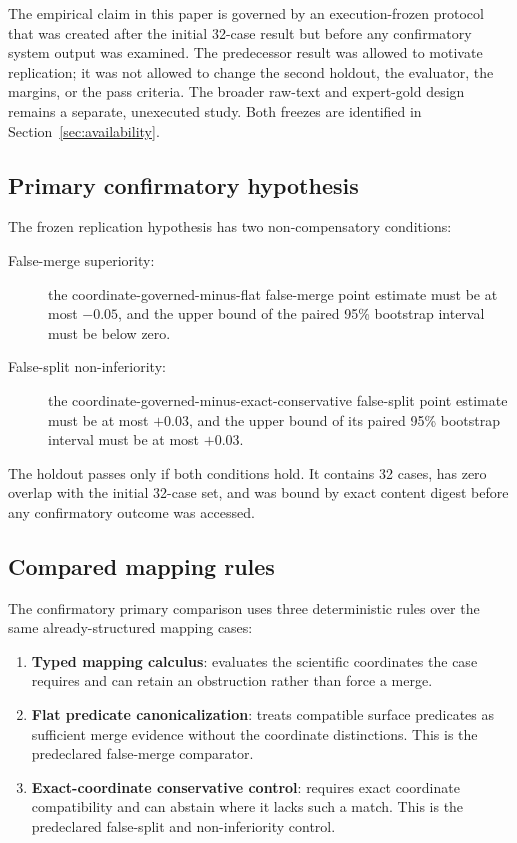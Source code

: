 The empirical claim in this paper is governed by an execution-frozen protocol
that was created after the initial 32-case result but before any confirmatory
system output was examined. The predecessor result was allowed to motivate
replication; it was not allowed to change the second holdout, the evaluator,
the margins, or the pass criteria. The broader raw-text and expert-gold design
remains a separate, unexecuted study. Both freezes are identified in
Section~\ref{sec:availability}.

\subsection{Primary confirmatory hypothesis}

The frozen replication hypothesis has two non-compensatory conditions:

\begin{description}
    \item[False-merge superiority:] the coordinate-governed-minus-flat
        false-merge point estimate must be at most $-0.05$, and the upper
        bound of the paired 95\% bootstrap interval must be below zero.
    \item[False-split non-inferiority:] the
        coordinate-governed-minus-exact-conservative false-split point
        estimate must be at most $+0.03$, and the upper bound of its paired
        95\% bootstrap interval must be at most $+0.03$.
\end{description}

The holdout passes only if both conditions hold. It contains 32 cases, has
zero overlap with the initial 32-case set, and was bound by exact content
digest before any confirmatory outcome was accessed.

\subsection{Compared mapping rules}

The confirmatory primary comparison uses three deterministic rules over the
same already-structured mapping cases:

\begin{enumerate}
    \item \textbf{Typed mapping calculus}: evaluates the scientific
        coordinates the case requires and can retain an obstruction rather
        than force a merge.
    \item \textbf{Flat predicate canonicalization}: treats compatible surface
        predicates as sufficient merge evidence without the coordinate
        distinctions. This is the predeclared false-merge comparator.
    \item \textbf{Exact-coordinate conservative control}: requires exact
        coordinate compatibility and can abstain where it lacks such a match.
        This is the predeclared false-split and non-inferiority control.
\end{enumerate}

